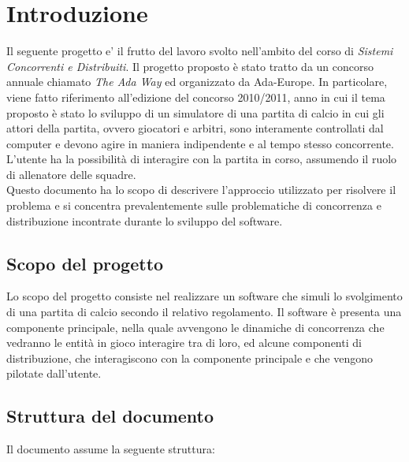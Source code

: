 
\section{Introduzione}
\label{sec:introduzione}

Il seguente progetto e' il frutto del lavoro svolto nell'ambito del corso di \emph{Sistemi Concorrenti e Distribuiti}. Il progetto proposto \`{e} stato tratto da un concorso annuale chiamato \emph{The Ada Way} ed organizzato da Ada-Europe. In particolare, viene fatto riferimento all'edizione del concorso 2010/2011, anno in cui il tema proposto \`{e} stato lo sviluppo di un simulatore di una partita di calcio in cui gli attori della partita, ovvero giocatori e arbitri, sono interamente controllati dal computer e devono agire in maniera indipendente e al tempo stesso concorrente. L'utente ha la possibilit\`{a} di interagire con la partita in corso, assumendo il ruolo di allenatore delle squadre.\\

Questo documento ha lo scopo di descrivere l'approccio utilizzato per risolvere il problema e si concentra prevalentemente sulle problematiche di concorrenza e distribuzione incontrate durante lo sviluppo del software.

\subsection{Scopo del progetto}
\label{sec:scopo_del_progetto}

Lo scopo del progetto consiste nel realizzare un software che simuli lo svolgimento di una partita di calcio secondo il relativo regolamento. Il software \`{e} presenta una componente principale, nella quale avvengono le dinamiche di concorrenza che vedranno le entit\`{a} in gioco interagire tra di loro, ed alcune componenti di distribuzione, che interagiscono con la componente principale e che vengono pilotate dall'utente.

\subsection{Struttura del documento}
\label{sec:struttura_del_documento}

Il documento assume la seguente struttura:

